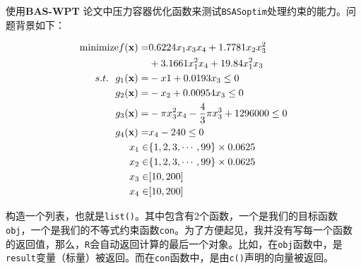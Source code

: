 \documentclass[]{ctexbook}
\theoremstyle{definition}
\theoremstyle{definition}
\theoremstyle{definition}
\theoremstyle{remark}
\begin{document}
使用\textbf{BAS-WPT}\citep{Jiangwpt}
论文中压力容器优化函数来测试\texttt{BSASoptim}处理约束的能力。问题背景如下：

\begin{align}
\text{minimize} f(\mathbf{x}) = &0.6224x_1x_3x_4+1.7781x_2x^2_3 \notag\\
&+3.1661x^2_1x_4 + 19.84x^2_1x_3 \notag \\
s.t. ~~ g_1(\mathbf{x}) = & -x1 + 0.0193x_3 \leq 0 \notag \\
g_2(\mathbf{x}) = & -x_2 + 0.00954x_3 \leq 0 \notag \\
g_3(\mathbf{x}) = & -\pi x^2_3x_4 -\frac{4}{3}\pi x^3_3 + 1296000 \leq 0 \notag \\
g_4(\mathbf{x}) = & x_4-240\leq 0 \notag \\
x_1 \in& \{1,2,3,\cdots,99\}\times0.0625 \notag \\
x_2 \in& \{1,2,3,\cdots,99\}\times0.0625 \notag \\
x_3 \in& [10,200] \notag \\
x_4 \in& [10,200] \notag \\
\label{eq:PV}
\end{align}

构造一个列表，也就是\texttt{list()}。其中包含有2个函数，一个是我们的目标函数\texttt{obj}，一个是我们的不等式约束函数\texttt{con}。为了方便起见，我并没有写每一个函数的返回值，那么，\texttt{R}会自动返回计算的最后一个对象。比如，在\texttt{obj}函数中，是\texttt{result}变量（标量）被返回。而在\texttt{con}函数中，是由\texttt{c()}声明的向量被返回。
\end{document}
